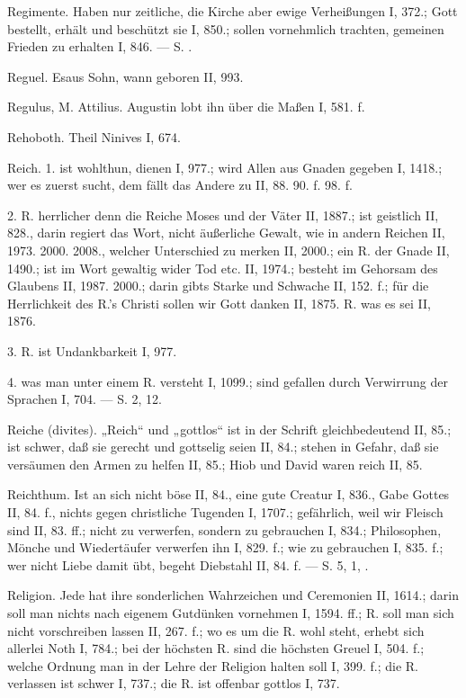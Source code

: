 Regimente. Haben nur zeitliche, die Kirche aber ewige Verheißungen I, 372.; Gott bestellt, erhält und beschützt sie I, 850.; sollen vornehmlich trachten, gemeinen Frieden zu erhalten I, 846. — S. .

Reguel. Esaus Sohn, wann geboren II, 993.

Regulus, M. Attilius. Augustin lobt ihn über die Maßen I, 581. f.

Rehoboth. Theil Ninives I, 674.

Reich. 1.  ist wohlthun, dienen I, 977.; wird Allen aus Gnaden gegeben I, 1418.; wer es zuerst sucht, dem fällt das Andere zu II, 88. 90. f. 98. f.

2. R.  herrlicher denn die Reiche Moses und der Väter II, 1887.; ist geistlich II, 828., darin regiert das Wort, nicht äußerliche Gewalt, wie in andern Reichen II, 1973. 2000. 2008., welcher Unterschied zu merken II, 2000.; ein R. der Gnade II, 1490.; ist im Wort gewaltig wider Tod etc. II, 1974.; besteht im Gehorsam des Glaubens II, 1987. 2000.; darin gibts Starke und Schwache II, 152. f.; für die Herrlichkeit des R.’s Christi sollen wir Gott danken II, 1875. R.  was es sei II, 1876.

3. R.  ist Undankbarkeit I, 977.

4.  was man unter einem R. versteht I, 1099.; sind gefallen durch Verwirrung der Sprachen I, 704. — S.  2,  12.

Reiche (divites). „Reich“ und „gottlos“ ist in der Schrift gleichbedeutend II, 85.; ist schwer, daß sie gerecht und gottselig seien II, 84.; stehen in Gefahr, daß sie versäumen den Armen zu helfen II, 85.; Hiob und David waren reich II, 85.

Reichthum. Ist an sich nicht böse II, 84., eine gute Creatur I, 836., Gabe Gottes II, 84. f., nichts gegen christliche Tugenden I, 1707.; gefährlich, weil wir Fleisch sind II, 83. ff.; nicht zu verwerfen, sondern zu gebrauchen I, 834.; Philosophen, Mönche und Wiedertäufer verwerfen ihn I, 829. f.; wie zu gebrauchen I, 835. f.; wer nicht Liebe damit übt, begeht Diebstahl II, 84. f. — S.  5,  1, .

Religion. Jede hat ihre sonderlichen Wahrzeichen und Ceremonien II, 1614.; darin soll man nichts nach eigenem Gutdünken vornehmen I, 1594. ff.; R. soll man sich nicht vorschreiben lassen II, 267. f.; wo es um die R. wohl steht, erhebt sich allerlei Noth I, 784.; bei der höchsten R. sind die höchsten Greuel I, 504. f.; welche Ordnung man in der Lehre der Religion halten soll I, 399. f.; die  R. verlassen ist schwer I, 737.; die  R. ist offenbar gottlos I, 737.

